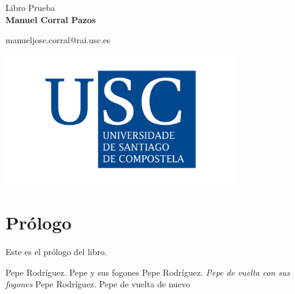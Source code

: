 \documentclass[12pt,a4paper]{book}
\begin{document}
\frontmatter
	\begin{titlepage}
		\begin{center}
		{\huge Libro Prueba}\\ \vspace{3cm}
		{\bf Manuel Corral Pazos}\vspace{1cm}
		
		{manueljose.corral@rai.usc.es}
		\\ \vspace{2cm}

		\includegraphics[width=10cm]{logoUSC.png}
		\end{center}
	\end{titlepage}

	\tableofcontents
	\listoftables
	
	\chapter{Prólogo}

	Este es el prólogo del libro.
	
	\mainmatter
	
	
	
	
	
	
	
	\backmatter      
	\begin{thebibliography}{9}
		 Pepe Rodríguez. Pepe y sus fogones       
		 Pepe Rodríguez. {\textit{Pepe de vuelta con sus fogones}}
		 Pepe Rodríguez. \textsf{Pepe de vuelta de nuevo}
	\end{thebibliography}
	\printindex
	
\end{document}
